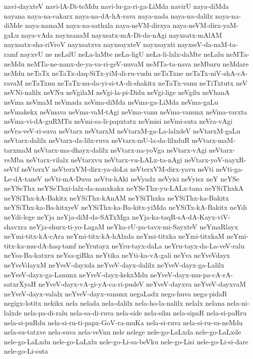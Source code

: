 {navi-dayxteV
navi-lA-Di-teMdu
navi-lu-ga-ri-ga-LiMda
navirU
naya-diMda
nayana
naya-na-cakarx
naya-na-dA-hA-rava
naya-nada
naya-na-dalilx
naya-na-diMde
naya-namaM
naya-na-sathxla
naya-neVM-dirxya
naya-neVM-dirx-yaM-gaLu
naya-vAda
nayxsanaM
nayxsatx-mA-Di-da-nAgi
nayxsatx-mAlAM
nayxsatx-sha-riVroV
nayxsatxva
nayxsayxteV
nayxsayxti
nayxseV-da-naM-ta-ramf
nayxvU
ne
neLalU
neLa-laMte
neLa-ligU
neLa-li-lalx-daMte
neLalu
neMTa-neMdu
neMTa-ne-nanx-de-ya-va-ri-geV-nuvaM
neMTa-ta-nava
neMbaru
neMdare
neMdu
neTaTx
neTaTx-daq-SiTx-yiM-di-ru-vudu
neTaTxne
neTaTx-niV-shA-cA-ravaM
neTaTxnu
neTaTx-nu-da-yi-si-tA-di-shakitx
neTaTx-vanu
neTiTxtutx
neV
neVNi-nalilx
neVNu
neVgilaM
neVgi-la-pi-Didu
neVgi-lige
neVgilu
neVhanA
neVma
neVmaM
neVmada
neVma-diMda
neVma-ga-LiMda
neVma-gaLu
neVmakekx
neVmava
neVma-vaM-tAgi
neVma-vanu
neVma-vanunx
neVma-varxta
neVma-vi-dA-guRMTu
neVmi-sa-li-papxtatx
neVmisi
neVmi-suta
neVra-vAgi
neVra-veV-ri-suva
neVtarx
neVtarxM
neVtarxM-ga-La-lalxdeV
neVtarxM-gaLu
neVtarx-dalilx
neVtarx-da-lilx-ruva
neVtarx-mU-la-da-lilxduR
neVtarx-maM-tarxmaM
neVtarx-ma-dhayx-dalilx
neVtarx-na-yoVga
neVtarx-vAgi
neVtarx-veMba
neVtarx-vilalx
neVtarxvu
neVtarx-vu-LALx-ta-nAgi
neVtarx-yoV-nayxR-seVtf
neVterxV
neVterxVM-dirx-ya-doLu
neVterxVM-dirx-yavu
neVti
neVti-ga-Le-dA-taneV
neVti-mA-Duva
neVtu-hAki
neVyadx
neVyisi
neVyisx
neY
neYSe
neYSeThx
neYSeThxi-lalx-da-nanxkakx
neYSeThx-yu-LALx-tana
neYSiThxkA
neYSiThx-kA-Bakitx
neYSiThx-kAnAM
neYSiThxka
neYSiThx-ka-Bakitx
neYSiThx-ka-Ba-kitxyeV
neYSiThx-ka-Ba-kitx-yiMda
neYSiTx-kA-Bakitx
neYdi
neYdi-lege
neYja
neYja-diM-da-SATxMga
neYja-ka-taqR-sA-dA-Kayx-viV-shavxra
neYja-shurx-ti-yo-LagaM
neYka-rU-pa-tavx-mi-SayxteV
neYmaRlayx
neYmi-titx-kA-cAra
neYmi-titx-kA-hAlxda
neYmi-titxka
neYmi-titxkaM
neYmi-titx-ka-mu-dA-haq-tamf
neYrutayx
neYru-tayx-daLa
neYru-tayx-da-La-veV-ralu
neYsa-Ba-katxru
neYsa-giRka
neYtika
neYti-ka-vA-gali
neYva
neYveVdayx
neYveVdayxM
neYveV-dayxda
neYveV-dayx-dalilx
neYveV-dayx-ga-Lalilx
neYveV-dayx-ga-Lanunx
neYveV-dayx-kekxMdu
neYveV-dayx-mu-pa-cA-rA-satxrXyaH
neYveV-dayx-vA-gi-yA-ca-ri-pudeV
neYveV-dayxva
neYveV-dayxvaM
neYveV-dayx-valalx
neYveV-dayx-vanunx
negaLadx
nega-huva
nega-pidaR
negigx-lotitx
nekikx
nela
nelada
nela-dalilx
nela-ho-la-nalilx
nelalx
nelana
nela-ni-lalxde
nela-pa-di-ralu
nela-sa-di-ruva
nela-side
nela-sihu
nela-sipaR
nela-si-paRru
nela-si-puRdu
nela-si-ru-ti-papx-GoV-ra-muKa
nela-si-ruva
nela-si-ru-va-neMdu
nela-su-tatxve
nela-suva
nela-veVnu
nele
nelege
nele-go-LaLxda
nele-go-LaLxde
nele-go-LaLxdu
nele-go-LaLxlu
nele-go-Li-sa-beVku
nele-go-Lisi
nele-go-Li-si-dare
nele-go-Li-suta
}
